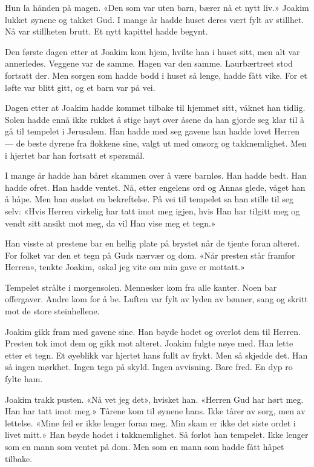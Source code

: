 Hun la hånden på magen.
«Den som var uten barn, bærer nå et nytt liv.»
Joakim lukket øynene og takket Gud.
I mange år hadde huset deres vært fylt av stillhet.
Nå var stillheten brutt.
Et nytt kapittel hadde begynt.

Den første dagen etter at Joakim kom hjem, hvilte han i huset sitt,
men alt var annerledes.
Veggene var de samme.
Hagen var den samme.
Laurbærtreet stod fortsatt der.
Men sorgen som hadde bodd i huset så lenge, hadde fått vike.
For et løfte var blitt gitt, og et barn var på vei.


Dagen etter at Joakim hadde kommet tilbake til hjemmet sitt, våknet han tidlig.
Solen hadde ennå ikke rukket å stige høyt over åsene
da han gjorde seg klar til å gå til tempelet i Jerusalem.
Han hadde med seg gavene han hadde lovet Herren --- de beste
dyrene fra flokkene sine, valgt ut med omsorg og takknemlighet.
Men i hjertet bar han fortsatt et spørsmål.

I mange år hadde han båret skammen over å være barnløs.
Han hadde bedt. Han hadde ofret. Han hadde ventet.
Nå, etter engelens ord og Annas glede, våget han å håpe.
Men han ønsket en bekreftelse.
På vei til tempelet sa han stille til seg selv:
«Hvis Herren virkelig har tatt imot meg igjen,
hvis Han har tilgitt meg og vendt sitt ansikt mot meg,
da vil Han vise meg et tegn.»

Han visste at prestene bar en hellig plate på brystet
når de tjente foran alteret. For folket var den et tegn på Guds nærvær og dom.
«Når presten står framfor Herren», tenkte Joakim,
«skal jeg vite om min gave er mottatt.»

Tempelet strålte i morgensolen.
Mennesker kom fra alle kanter. Noen bar offergaver.
Andre kom for å be. Luften var fylt av lyden av bønner,
sang og skritt mot de store steinhellene.

Joakim gikk fram med gavene sine.
Han bøyde hodet og overlot dem til Herren.
Presten tok imot dem og gikk mot alteret.
Joakim fulgte nøye med. Han lette etter et tegn.
Et øyeblikk var hjertet hans fullt av frykt.
Men så skjedde det.
Han så ingen mørkhet.
Ingen tegn på skyld.
Ingen avvisning.
Bare fred.
En dyp ro fylte ham.

Joakim trakk pusten.
«Nå vet jeg det», hvisket han.
«Herren Gud har hørt meg. Han har tatt imot meg.»
Tårene kom til øynene hans.
Ikke tårer av sorg, men av lettelse.
«Mine feil er ikke lenger foran meg.
Min skam er ikke det siste ordet i livet mitt.»
Han bøyde hodet i takknemlighet.
Så forlot han tempelet.
Ikke lenger som en mann som ventet på dom.
Men som en mann som hadde fått håpet tilbake.
